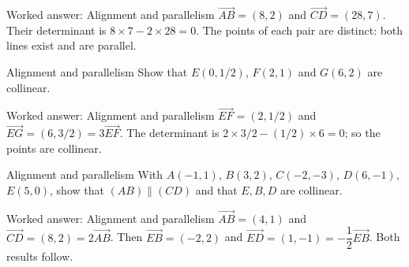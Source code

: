 \documentclass[aspectratio=169,10pt]{beamer}
\providecommand{\vect}[1]{\overrightarrow{#1}}
\begin{document}
\begin{frame}{Worked answer: Alignment and parallelism}
\(\vect{AB}=(8,2)\) and \(\vect{CD}=(28,7)\). Their determinant is \(8\times7-2\times28=0\). The points of each pair are distinct: both lines exist and are parallel.
\end{frame}
\begin{frame}{Alignment and parallelism}
Show that \(E(0,1/2)\), \(F(2,1)\) and \(G(6,2)\) are collinear.
\end{frame}
\begin{frame}{Worked answer: Alignment and parallelism}
\(\vect{EF}=(2,1/2)\) and \(\vect{EG}=(6,3/2)=3\vect{EF}\). The determinant is \(2\times3/2-(1/2)\times6=0\); so the points are collinear.
\end{frame}
\begin{frame}{Alignment and parallelism}
With \(A(-1,1)\), \(B(3,2)\), \(C(-2,-3)\), \(D(6,-1)\), \(E(5,0)\), show that \((AB)\parallel(CD)\) and that \(E,B,D\) are collinear.
\end{frame}
\begin{frame}{Worked answer: Alignment and parallelism}
\(\vect{AB}=(4,1)\) and \(\vect{CD}=(8,2)=2\vect{AB}\). Then \(\vect{EB}=(-2,2)\) and \(\vect{ED}=(1,-1)=-\dfrac12\vect{EB}\). Both results follow.
\end{frame}
\end{document}

